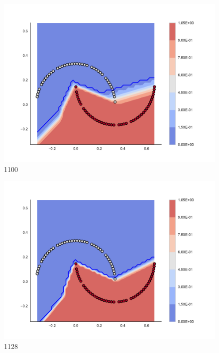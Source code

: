 \begin{subfigure}[b]{0.09\textwidth}
    \includegraphics[clip, trim=2.35cm 1.75cm 4.5cm 0cm,width=\textwidth]{img/convergence/1100.pdf}
    \caption{1100}
    \label{fig:convergence_1100}
\end{subfigure}
%
\begin{subfigure}[b]{0.09\textwidth}
    \includegraphics[clip, trim=2.35cm 1.75cm 4.5cm 0cm,width=\textwidth]{img/convergence/1128.pdf}
    \caption{1128}
    \label{fig:convergence_1128}
\end{subfigure}
%

